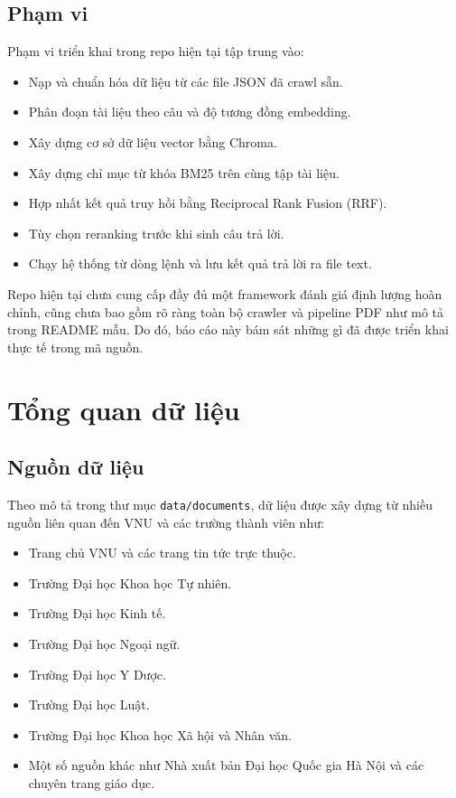 \documentclass[12pt,a4paper]{article}
\begin{document}
\subsection{Phạm vi}

Phạm vi triển khai trong repo hiện tại tập trung vào:
\begin{itemize}[leftmargin=1.5cm]
    \item Nạp và chuẩn hóa dữ liệu từ các file JSON đã crawl sẵn.
    \item Phân đoạn tài liệu theo câu và độ tương đồng embedding.
    \item Xây dựng cơ sở dữ liệu vector bằng Chroma.
    \item Xây dựng chỉ mục từ khóa BM25 trên cùng tập tài liệu.
    \item Hợp nhất kết quả truy hồi bằng Reciprocal Rank Fusion (RRF).
    \item Tùy chọn reranking trước khi sinh câu trả lời.
    \item Chạy hệ thống từ dòng lệnh và lưu kết quả trả lời ra file text.
\end{itemize}

Repo hiện tại chưa cung cấp đầy đủ một framework đánh giá định lượng hoàn chỉnh, cũng chưa bao gồm rõ ràng toàn bộ crawler và pipeline PDF như mô tả trong README mẫu. Do đó, báo cáo này bám sát những gì đã được triển khai thực tế trong mã nguồn.

\section{Tổng quan dữ liệu}

\subsection{Nguồn dữ liệu}

Theo mô tả trong thư mục \texttt{data/documents}, dữ liệu được xây dựng từ nhiều nguồn liên quan đến VNU và các trường thành viên như:
\begin{itemize}[leftmargin=1.5cm]
    \item Trang chủ VNU và các trang tin tức trực thuộc.
    \item Trường Đại học Khoa học Tự nhiên.
    \item Trường Đại học Kinh tế.
    \item Trường Đại học Ngoại ngữ.
    \item Trường Đại học Y Dược.
    \item Trường Đại học Luật.
    \item Trường Đại học Khoa học Xã hội và Nhân văn.
    \item Một số nguồn khác như Nhà xuất bản Đại học Quốc gia Hà Nội và các chuyên trang giáo dục.
\end{itemize}
\end{document}
